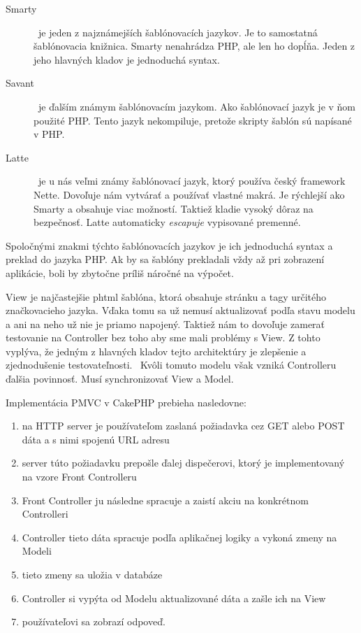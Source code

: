 \documentclass[12pt,onesided]{book}
\begin{document}
\begin{description}
\item [Smarty] \cite{Smarty}\  je jeden z najznámejších šablónovacích jazykov. Je to samostatná šablónovacia knižnica. Smarty nenahrádza PHP, ale len ho dopĺňa. Jeden z jeho hlavných kladov je jednoduchá syntax.
\item [Savant] \cite{Savant}\  je ďalším známym šablónovacím jazykom. Ako šablónovací jazyk je v ňom použité PHP. Tento jazyk nekompiluje, pretože skripty šablón sú napísané v PHP.
\item [Latte] \cite{Latte}\  je u nás veľmi známy šablónovací jazyk, ktorý používa český framework Nette. Dovoľuje nám vytvárať a používať vlastné makrá. Je rýchlejší ako Smarty a obsahuje viac možností. Taktiež kladie vysoký dôraz na bezpečnosť. Latte automaticky \emph{escapuje} vypisované premenné.
\end{description}

Spoločnými znakmi týchto šablónovacích jazykov je ich jednoduchá syntax a preklad do jazyka PHP. Ak by sa šablóny prekladali vždy až pri zobrazení aplikácie, boli by zbytočne príliš náročné na výpočet.
\newline

View je najčastejšie phtml šablóna, ktorá obsahuje stránku a tagy určitého značkovacieho jazyka. Vďaka tomu sa už nemusí aktualizovať podľa stavu modelu a ani na neho už nie je priamo napojený. Taktiež nám to dovoľuje zamerať testovanie na Controller bez toho aby sme mali problémy s View. Z tohto vyplýva, že jedným z hlavných kladov tejto architektúry je zlepšenie a zjednodušenie testovateľnosti. \cite{PMVC}\  Kvôli tomuto modelu však vzniká Controlleru ďalšia povinnosť. Musí synchronizovať View a Model. 
\newline

Implementácia PMVC v CakePHP prebieha nasledovne:

\begin{enumerate}
\item na HTTP server je používateľom zaslaná požiadavka cez GET alebo POST dáta a s nimi spojenú URL adresu
\item server túto požiadavku prepošle ďalej dispečerovi, ktorý je implementovaný na vzore Front Controlleru
\item Front Controller ju následne spracuje a zaistí akciu na konkrétnom Controlleri
\item Controller tieto dáta spracuje podľa aplikačnej logiky a vykoná zmeny na Modeli
\item tieto zmeny sa uložia v databáze 
\item Controller si vypýta od Modelu aktualizované dáta a zašle ich na View
\item používateľovi sa zobrazí odpoveď.
\end{enumerate}
 
\end{document}

